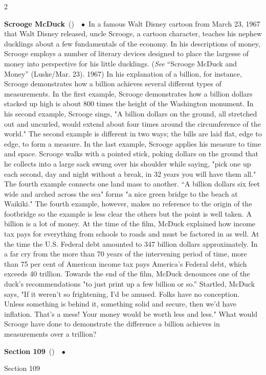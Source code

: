 \documentclass[10pt,a4paper,twoside]{article} %
\newcommand{\entry}[4]{\markboth{#1}{#1}\textbf{#1}\ {(#2)}\ \textit{#3}\ $\bullet$\ {#4}}  %
\begin{document}
\begin{multicols}{2}
\entry{Scrooge McDuck} {} {} {In a famous Walt Disney cartoon from March 23, 1967 that Walt Disney released, uncle Scrooge, a cartoon character, teaches his nephew ducklings about a few fundamentals of the economy. In his descriptions of money, Scrooge employs a number of literary devices designed to place the largesse of money into perspective for his little ducklings.  (\emph{See}  “Scrooge McDuck and Money” (Luske/Mar. 23). 1967) \newline \indent In his explanation of a billion, for instance, Scrooge demonstrates how a billion achieves several different types of measurements.  In the first example, Scrooge demonstrates how a billion dollars stacked up high is about 800 times the height of the Washington monument. In his second example, Scrooge sings, "A billion dollars on the ground, all stretched out and uncurled, would extend about four times around the circumference of the world." The second example is different in two ways; the bills are laid flat, edge to edge, to form a measure. In the last example, Scrooge applies his measure to time and space. Scrooge walks with a pointed stick, poking dollars on the ground that he collects into a large sack swung over his shoulder while saying, "pick one up each second, day and night without a break, in 32 years you will have them all." The fourth example connects one land mass to another. “A billion dollars six feet wide and arched across the sea" forms "a nice green bridge to the beach at Waikiki." The fourth example, however, makes no reference to the origin of the footbridge so the example is less clear the others but the point is well taken. A billion is a lot of money. At the time of the film, McDuck explained how income tax pays for everything from schools to roads and must be factored in as well. At the time the U.S. Federal debt amounted to 347 billion dollars approximately. In a far cry from the more than 70 years of the intervening period of time, more than 75 per cent of American income tax pays America's Federal debt, which exceeds 40 trillion. Towards the end of the film, McDuck denounces one of the duck's recommendations "to just print up a few billion or so.” Startled, McDuck says, "If it weren't so frightening, I'd be amused. Folks have no conception. Unless something is behind it, something solid and secure, then we'd have inflation. That's a mess! Your money would be worth less and less." What would Scrooge have done to demonstrate the difference a billion achieves in measurements over a trillion?}

\entry{Section 109} {} {} {Section 109


}
\end{multicols}
\end{document}

